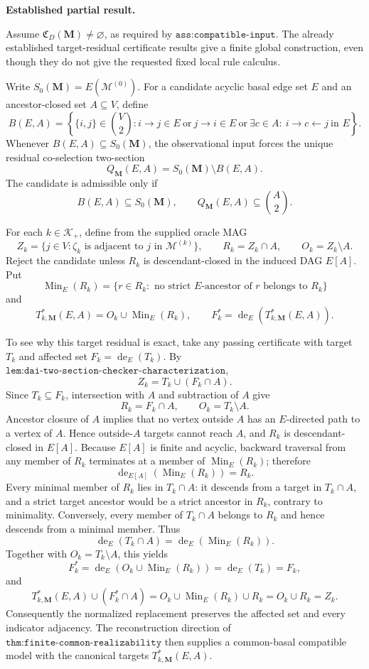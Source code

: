 \textbf{Established partial result.}

Assume \(\mathfrak C_D(\mathbf M)\ne\varnothing\), as required by \(\texttt{ass:compatible-input}\).  The already established target-residual certificate results give a finite global construction, even though they do not give the requested fixed local rule calculus.

Write \(S_0(\mathbf M)=E(\mathcal M^{(0)})\).  For a candidate acyclic basal edge set \(E\) and an ancestor-closed set \(A\subseteq V\), define
\[
B(E,A)=\left\{\{i,j\}\in\binom V2:
i\to j\in E\ \text{or}\ j\to i\in E\ \text{or}\
\exists c\in A:\ i\to c\leftarrow j\ \text{in }E
\right\}.
\]
Whenever \(B(E,A)\subseteq S_0(\mathbf M)\), the observational input forces the unique residual co-selection two-section
\[
Q_{\mathbf M}(E,A)=S_0(\mathbf M)\setminus B(E,A).
\]
The candidate is admissible only if
\[
B(E,A)\subseteq S_0(\mathbf M),
\qquad
Q_{\mathbf M}(E,A)\subseteq\binom A2.
\]

For each \(k\in\mathcal K_+\), define from the supplied oracle MAG
\[
Z_k=\{j\in V:\zeta_k\text{ is adjacent to }j\text{ in }\mathcal M^{(k)}\},
\qquad
R_k=Z_k\cap A,
\qquad
O_k=Z_k\setminus A.
\]
Reject the candidate unless \(R_k\) is descendant-closed in the induced DAG \(E[A]\).  Put
\[
\operatorname{Min}_E(R_k)
=\{r\in R_k:\text{ no strict }E\text{-ancestor of }r\text{ belongs to }R_k\}
\]
and
\[
T^{*}_{k,\mathbf M}(E,A)=O_k\cup\operatorname{Min}_E(R_k),
\qquad
F_k^{*}=\operatorname{de}_E\!\left(T^{*}_{k,\mathbf M}(E,A)\right).
\]

To see why this target residual is exact, take any passing certificate with target \(T_k\) and affected set \(F_k=\operatorname{de}_E(T_k)\).  By \(\texttt{lem:dai-two-section-checker-characterization}\),
\[
Z_k=T_k\cup(F_k\cap A).
\]
Since \(T_k\subseteq F_k\), intersection with \(A\) and subtraction of \(A\) give
\[
R_k=F_k\cap A,
\qquad
O_k=T_k\setminus A.
\]
Ancestor closure of \(A\) implies that no vertex outside \(A\) has an \(E\)-directed path to a vertex of \(A\).  Hence outside-\(A\) targets cannot reach \(A\), and \(R_k\) is descendant-closed in \(E[A]\).  Because \(E[A]\) is finite and acyclic, backward traversal from any member of \(R_k\) terminates at a member of \(\operatorname{Min}_E(R_k)\); therefore
\[
\operatorname{de}_{E[A]}\!\left(\operatorname{Min}_E(R_k)\right)=R_k.
\]
Every minimal member of \(R_k\) lies in \(T_k\cap A\): it descends from a target in \(T_k\cap A\), and a strict target ancestor would be a strict ancestor in \(R_k\), contrary to minimality.  Conversely, every member of \(T_k\cap A\) belongs to \(R_k\) and hence descends from a minimal member.  Thus
\[
\operatorname{de}_E(T_k\cap A)
=\operatorname{de}_E\!\left(\operatorname{Min}_E(R_k)\right).
\]
Together with \(O_k=T_k\setminus A\), this yields
\[
F_k^{*}
=\operatorname{de}_E\!\left(O_k\cup\operatorname{Min}_E(R_k)\right)
=\operatorname{de}_E(T_k)
=F_k,
\]
and
\[
T^{*}_{k,\mathbf M}(E,A)\cup(F_k^{*}\cap A)
=O_k\cup\operatorname{Min}_E(R_k)\cup R_k
=O_k\cup R_k
=Z_k.
\]
Consequently the normalized replacement preserves the affected set and every indicator adjacency.  The reconstruction direction of \(\texttt{thm:finite-common-realizability}\) then supplies a common-basal compatible model with the canonical targets \(T^{*}_{k,\mathbf M}(E,A)\).

